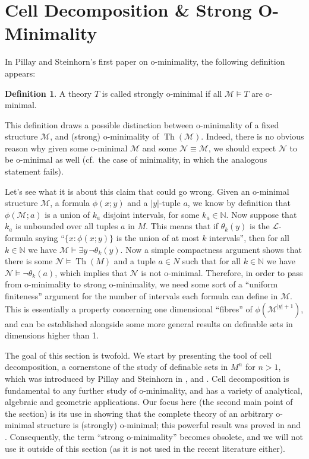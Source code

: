\documentclass[a4paper]{report}
\newcommand{\ind}{\hspace{15pt}}
\newcommand{\Nat}{\mathbb{N}}
\renewcommand{\L}{\mathcal{L}}
\newcommand{\M}{\mathcal{M}}
\newcommand{\N}{\mathcal{N}}
\DeclareMathOperator{\Th}{Th}
\theoremstyle{definition}
\newtheorem*{defn*}{Definition}
\theoremstyle{remstyle}
\begin{document}
\section{Cell Decomposition \& Strong O-Minimality}

\ind In Pillay and Steinhorn's first paper \cite{defI} on o-minimality, the following definition appears:

\begin{defn*}
	A theory $T$ is called strongly o-minimal if all $\M\models T$ are o-minimal.
\end{defn*}

This definition draws a possible distinction between o-minimality of a fixed structure $\M$, and (strong) o-minimality of $\Th(\M)$. Indeed, there is no obvious reason why given some o-minimal $\M$ and some $\N\equiv\M$, we should expect $\N$ to be o-minimal as well (cf.\ the case of minimality, in which the analogous statement fails).

\ind Let's see what it is about this claim that could go wrong. Given an o-minimal structure $\M$, a formula $\phi(x;y)$ and a $|y|$-tuple $a$, we know by definition that $\phi(\M;a)$ is a union of $k_a$ disjoint intervals, for some $k_a\in \Nat$. Now suppose that $k_a$ is unbounded over all tuples $a$ in $M$. This means that if $\theta_k(y)$ is the $\L$-formula saying ``$\{x:\phi(x;y)\}$ is the union of at most $k$ intervals'', then for all $k\in \Nat$ we have $\M\models \exists y\,\neg\theta_k(y)$. Now a simple compactness argument shows that there is some $\N\models \Th(M)$ and a tuple $a\in N$ such that for all $k\in\Nat$ we have $\N\models\neg\theta_k(a)$, which implies that $\N$ is not o-minimal. Therefore, in order to pass from o-minimality to strong o-minimality, we need some sort of a ``uniform finiteness'' argument for the number of intervals each formula can define in $\M$. This is essentially a property concerning one dimensional ``fibres'' of $\phi(\M^{|y|+1})$, and can be established alongside some more general results on definable sets in dimensions higher than 1.

\ind The goal of this section is twofold. We start by presenting the tool of cell decomposition, a cornerstone of the study of definable sets in $M^n$ for $n>1$, which was introduced by Pillay and Steinhorn in \cite{defII}, \cite{discrete} and \cite{defIII}. Cell decomposition is fundamental to any further study of o-minimality, and has a variety of analytical, algebraic and geometric applications. Our focus here (the second main point of the section) is its use in showing that the complete theory of an arbitrary o-minimal structure is (strongly) o-minimal; this powerful result was proved in \cite{defII} and \cite{defIII}. Consequently, the term ``strong o-minimality'' becomes obsolete, and we will not use it outside of this section (as it is not used in the recent literature either).
\end{document}
